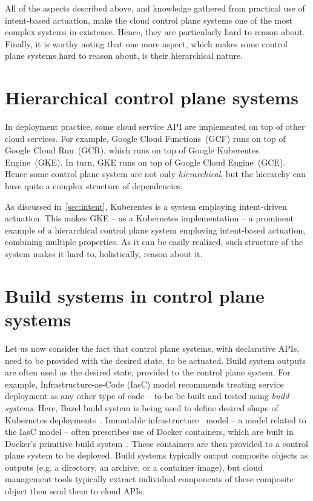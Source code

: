 All of the aspects described above, and knowledge gathered from practical use of intent-based actuation, make the cloud control plane systems one of the most complex systems in existence. Hence, they are particularly hard to reason about. Finally, it is worthy noting that one more aspect, which makes some control plane systems hard to reason about, is their hierarchical nature.


\section{Hierarchical control plane systems}

In deployment practice, some cloud service API are implemented on top of other cloud services. For example, Google Cloud Functions~(GCF) runs on top of Google Cloud Run~(GCR), which runs on top of Google Kuberentes Engine~(GKE). In turn, GKE runs on top of Google Cloud Engine~(GCE). Hence some control plane system are not only \textit{hierarchical}, but the hierarchy can have quite a complex structure of dependencies.

As discussed in~\cref{sec:intent}, Kuberentes is a system employing intent-driven actuation. This makes GKE -- as a Kubernetes implementation -- a prominent example of a hierarchical control plane system employing intent-based actuation, combining multiple properties. As it can be easily realized, such structure of the system makes it hard to, holistically, reason about it.


\section{Build systems in control plane systems}

Let us now consider the fact that control plane systems, with declarative APIs, need to be provided with the desired state, to be actuated. Build system outputs are often used as the desired state, provided to the control plane system. For example, Infrastructure-as-Code (IasC) model recommends treating service deployment as any other type of code -- to be be built and tested using \textit{build systems}. Here, Bazel build system is being used to define desired shape of Kubernetes deployments~\cite{bazelbuildrulesk8s,stripeskycfg}. Immutable infrastructure~\cite{immutable-infra-mikkelsen2019} model -- a model related to the IasC model -- often prescribes use of Docker containers, which are built in Docker's primitive build system~\cite{Mokhov2020}. These containers are then provided to a control plane system to be deployed. Build systems typically output composite objects as outputs (e.g. a directory, an archive, or a container image), but cloud management tools typically extract individual components of these composite object then send them to cloud APIs.

